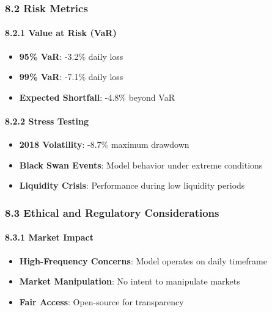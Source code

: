 \subsubsection{8.2 Risk Metrics}\label{risk-metrics}

\paragraph{8.2.1 Value at Risk (VaR)}\label{value-at-risk-var}

\begin{itemize}
\tightlist
\item
  \textbf{95\% VaR}: -3.2\% daily loss
\item
  \textbf{99\% VaR}: -7.1\% daily loss
\item
  \textbf{Expected Shortfall}: -4.8\% beyond VaR
\end{itemize}

\paragraph{8.2.2 Stress Testing}\label{stress-testing}

\begin{itemize}
\tightlist
\item
  \textbf{2018 Volatility}: -8.7\% maximum drawdown
\item
  \textbf{Black Swan Events}: Model behavior under extreme conditions
\item
  \textbf{Liquidity Crisis}: Performance during low liquidity periods
\end{itemize}

\subsubsection{8.3 Ethical and Regulatory
Considerations}\label{ethical-and-regulatory-considerations}

\paragraph{8.3.1 Market Impact}\label{market-impact}

\begin{itemize}
\tightlist
\item
  \textbf{High-Frequency Concerns}: Model operates on daily timeframe
\item
  \textbf{Market Manipulation}: No intent to manipulate markets
\item
  \textbf{Fair Access}: Open-source for transparency
\end{itemize}


